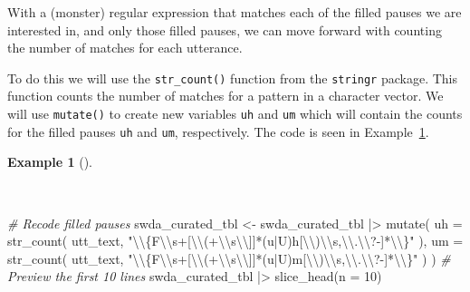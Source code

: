\documentclass[
  letterpaper,
  DIV=11,
  numbers=noendperiod]{scrreport}
\newenvironment{Shaded}{\begin{snugshade}}{\end{snugshade}}
\newcommand{\AttributeTok}[1]{\textcolor[rgb]{0.00,0.00,0.00}{#1}}
\newcommand{\CommentTok}[1]{\textcolor[rgb]{0.00,0.00,0.00}{\textit{#1}}}
\newcommand{\DecValTok}[1]{\textcolor[rgb]{0.00,0.00,0.00}{#1}}
\newcommand{\FunctionTok}[1]{\textcolor[rgb]{0.00,0.00,0.00}{#1}}
\newcommand{\NormalTok}[1]{\textcolor[rgb]{0.00,0.00,0.00}{#1}}
\newcommand{\OtherTok}[1]{\textcolor[rgb]{0.00,0.00,0.00}{#1}}
\newcommand{\SpecialCharTok}[1]{\textcolor[rgb]{0.00,0.00,0.00}{#1}}
\newcommand{\StringTok}[1]{\textcolor[rgb]{0.00,0.00,0.00}{#1}}
\theoremstyle{definition}
\newtheorem{example}{Example}[chapter]
\theoremstyle{remark}
\begin{document}
With a (monster) regular expression that matches each of the filled
pauses we are interested in, and only those filled pauses, we can move
forward with counting the number of matches for each utterance.

To do this we will use the \texttt{str\_count()} function from the
\texttt{stringr} package. This function counts the number of matches for
a pattern in a character vector. We will use \texttt{mutate()} to create
new variables \texttt{uh} and \texttt{um} which will contain the counts
for the filled pauses \texttt{uh} and \texttt{um}, respectively. The
code is seen in Example~\ref{exm-td-swda-recoding-filled-pauses}.

\begin{example}[]\protect\hypertarget{exm-td-swda-recoding-filled-pauses}{}\label{exm-td-swda-recoding-filled-pauses}

~

\begin{Shaded}
\begin{Highlighting}[]
\CommentTok{\# Recode filled pauses }
\NormalTok{swda\_curated\_tbl }\OtherTok{\textless{}{-}} 
\NormalTok{  swda\_curated\_tbl }\SpecialCharTok{|\textgreater{}}
  \FunctionTok{mutate}\NormalTok{(}
    \AttributeTok{uh =} \FunctionTok{str\_count}\NormalTok{(}
\NormalTok{      utt\_text, }
      \StringTok{"}\SpecialCharTok{\textbackslash{}\textbackslash{}}\StringTok{\{F}\SpecialCharTok{\textbackslash{}\textbackslash{}}\StringTok{s+[}\SpecialCharTok{\textbackslash{}\textbackslash{}}\StringTok{(+}\SpecialCharTok{\textbackslash{}\textbackslash{}}\StringTok{s}\SpecialCharTok{\textbackslash{}\textbackslash{}}\StringTok{]]*(u|U)h[}\SpecialCharTok{\textbackslash{}\textbackslash{}}\StringTok{)}\SpecialCharTok{\textbackslash{}\textbackslash{}}\StringTok{s,}\SpecialCharTok{\textbackslash{}\textbackslash{}}\StringTok{.}\SpecialCharTok{\textbackslash{}\textbackslash{}}\StringTok{?{-}]*}\SpecialCharTok{\textbackslash{}\textbackslash{}}\StringTok{\}"}
\NormalTok{    ),}
    \AttributeTok{um =} \FunctionTok{str\_count}\NormalTok{(}
\NormalTok{      utt\_text, }
      \StringTok{"}\SpecialCharTok{\textbackslash{}\textbackslash{}}\StringTok{\{F}\SpecialCharTok{\textbackslash{}\textbackslash{}}\StringTok{s+[}\SpecialCharTok{\textbackslash{}\textbackslash{}}\StringTok{(+}\SpecialCharTok{\textbackslash{}\textbackslash{}}\StringTok{s}\SpecialCharTok{\textbackslash{}\textbackslash{}}\StringTok{]]*(u|U)m[}\SpecialCharTok{\textbackslash{}\textbackslash{}}\StringTok{)}\SpecialCharTok{\textbackslash{}\textbackslash{}}\StringTok{s,}\SpecialCharTok{\textbackslash{}\textbackslash{}}\StringTok{.}\SpecialCharTok{\textbackslash{}\textbackslash{}}\StringTok{?{-}]*}\SpecialCharTok{\textbackslash{}\textbackslash{}}\StringTok{\}"}
\NormalTok{    )}
\NormalTok{  )}
\CommentTok{\# Preview the first 10 lines }
\NormalTok{swda\_curated\_tbl }\SpecialCharTok{|\textgreater{}}
  \FunctionTok{slice\_head}\NormalTok{(}\AttributeTok{n =} \DecValTok{10}\NormalTok{)}
\end{Highlighting}
\end{Shaded}


\end{example}
\end{document}
